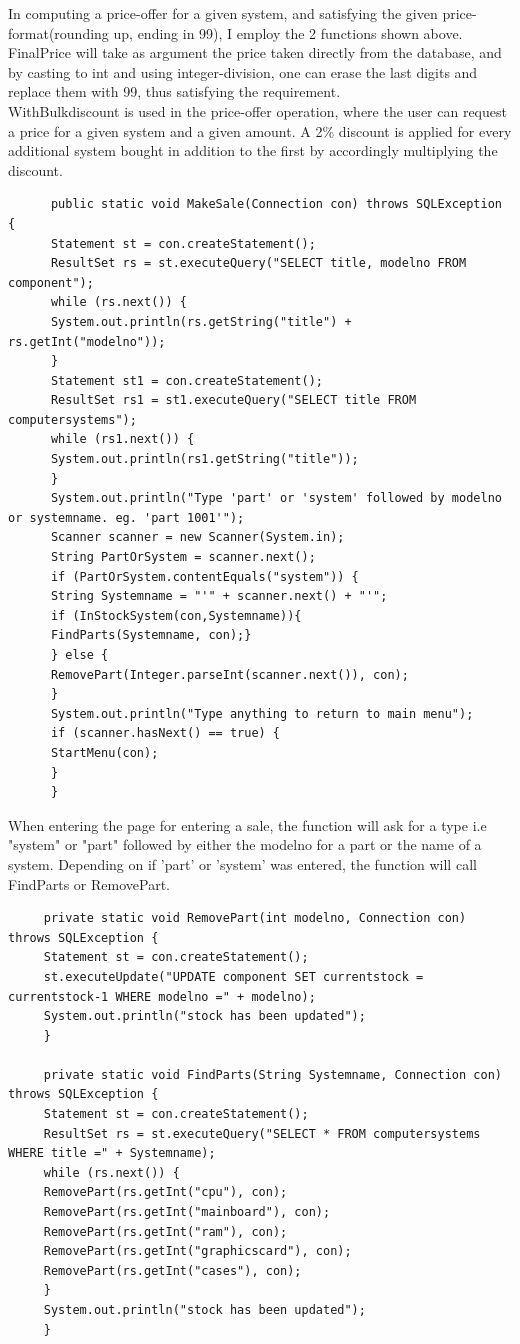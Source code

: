 \documentclass[a4paper,10pt]{article}
\begin{document}
In computing a price-offer for a given system, and satisfying the given price-format(rounding up, ending in 99), I employ the 2 functions shown above. FinalPrice will take as argument the price taken directly from the database, and by casting to int and using integer-division, one can erase the last digits and replace them with 99, thus satisfying the requirement. \\
WithBulkdiscount is used in the price-offer operation, where the user can request a price for a given system and a given amount. A 2\% discount is applied for every additional system bought in addition to the first by accordingly multiplying the discount.
\begin{lstlisting}
	  public static void MakeSale(Connection con) throws SQLException {
	  Statement st = con.createStatement();
	  ResultSet rs = st.executeQuery("SELECT title, modelno FROM component");
	  while (rs.next()) {
	  System.out.println(rs.getString("title") + rs.getInt("modelno"));
	  }
	  Statement st1 = con.createStatement();
	  ResultSet rs1 = st1.executeQuery("SELECT title FROM computersystems");
	  while (rs1.next()) {
	  System.out.println(rs1.getString("title"));
	  }
	  System.out.println("Type 'part' or 'system' followed by modelno or systemname. eg. 'part 1001'");
	  Scanner scanner = new Scanner(System.in);
	  String PartOrSystem = scanner.next();
	  if (PartOrSystem.contentEquals("system")) {
	  String Systemname = "'" + scanner.next() + "'";
	  if (InStockSystem(con,Systemname)){
	  FindParts(Systemname, con);}
	  } else {
	  RemovePart(Integer.parseInt(scanner.next()), con);
	  }
	  System.out.println("Type anything to return to main menu");
	  if (scanner.hasNext() == true) {
	  StartMenu(con);
	  }
	  }
\end{lstlisting}
When entering the page for entering a sale, the function will ask for a type i.e "system" or "part" followed by either the modelno for a part or the name of a system. Depending on if 'part' or 'system' was entered, the function will call FindParts or RemovePart.
\begin{lstlisting}
	 private static void RemovePart(int modelno, Connection con) throws SQLException {
	 Statement st = con.createStatement();
	 st.executeUpdate("UPDATE component SET currentstock = currentstock-1 WHERE modelno =" + modelno);
	 System.out.println("stock has been updated");
	 }
	 
	 private static void FindParts(String Systemname, Connection con) throws SQLException {
	 Statement st = con.createStatement();
	 ResultSet rs = st.executeQuery("SELECT * FROM computersystems WHERE title =" + Systemname);
	 while (rs.next()) {
	 RemovePart(rs.getInt("cpu"), con);
	 RemovePart(rs.getInt("mainboard"), con);
	 RemovePart(rs.getInt("ram"), con);
	 RemovePart(rs.getInt("graphicscard"), con);
	 RemovePart(rs.getInt("cases"), con);
	 }
	 System.out.println("stock has been updated");
	 }
\end{lstlisting}
\end{document}
